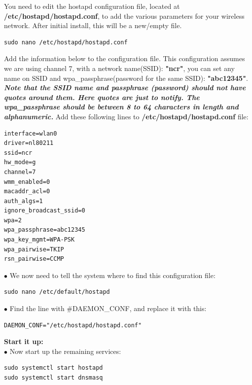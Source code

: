 \documentclass[journal,12pt,onecolumn]{IEEEtran}
\begin{document}
\begin{flushleft}
You need to edit the hostapd configuration file, located at \textbf{/etc/hostapd/hostapd.conf}, to add the various parameters for your wireless network. After initial install, this will be a new/empty file.\\
\medskip
\bigskip
\begin{lstlisting}[frame=single,linewidth=10cm,breaklines=true]
sudo nano /etc/hostapd/hostapd.conf
\end{lstlisting}
\bigskip
Add the information below to the configuration file. This configuration assumes we are using channel 7, with a network name(SSID): \textbf{"ncr"}, you can set any name on SSID and wpa\_passphrase(password for the same SSID): \textbf{"abc12345"}.\\
\medskip
\textbf {\textit{Note that the SSID name and passphrase (password) should not have quotes around them. Here quotes are just to notify. The wpa\_passphrase should be between 8 to 64 characters in length and alphanumeric.}}
\bigskip
Add these following lines to \textbf{/etc/hostapd/hostapd.conf} file:
\bigskip
\begin{lstlisting}[frame=single,linewidth=15cm,breaklines=true]
interface=wlan0
driver=nl80211
ssid=ncr
hw_mode=g
channel=7
wmm_enabled=0
macaddr_acl=0
auth_algs=1
ignore_broadcast_ssid=0
wpa=2
wpa_passphrase=abc12345
wpa_key_mgmt=WPA-PSK
wpa_pairwise=TKIP
rsn_pairwise=CCMP
\end{lstlisting}
\bigskip

$\bullet$ We now need to tell the system where to find this configuration file: \\
\bigskip
\begin{lstlisting}[frame=single,linewidth=8cm,breaklines=true]
sudo nano /etc/default/hostapd
\end{lstlisting}
\bigskip
$\bullet$ Find the line with  \#DAEMON\_CONF, and replace it with this: \\
\bigskip
\begin{lstlisting}[frame=single,linewidth=8cm,breaklines=true]
DAEMON_CONF="/etc/hostapd/hostapd.conf"
\end{lstlisting}
\bigskip
\textbf{Start it up:} \\
\bigskip
$\bullet$ Now start up the remaining services:\\
\bigskip
\begin{lstlisting}[frame=single,linewidth=8cm,breaklines=true]
sudo systemctl start hostapd
sudo systemctl start dnsmasq
\end{lstlisting}
\bigskip


\end{flushleft}
\end{document}
